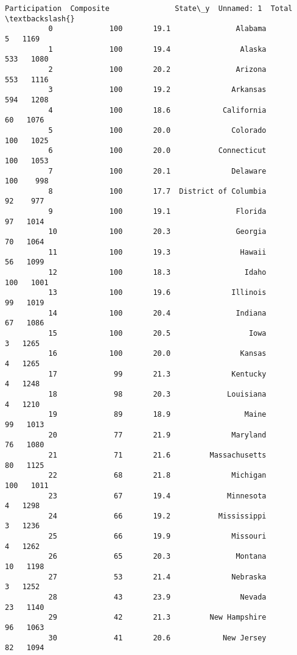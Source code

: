 \documentclass[11pt]{article}
\begin{document}
\begin{Verbatim}[commandchars=\\\{\}]
              Participation  Composite               State\_y  Unnamed: 1  Total  \textbackslash{}
          0             100       19.1               Alabama           5   1169   
          1             100       19.4                Alaska         533   1080   
          2             100       20.2               Arizona         553   1116   
          3             100       19.2              Arkansas         594   1208   
          4             100       18.6            California          60   1076   
          5             100       20.0              Colorado         100   1025   
          6             100       20.0           Connecticut         100   1053   
          7             100       20.1              Delaware         100    998   
          8             100       17.7  District of Columbia          92    977   
          9             100       19.1               Florida          97   1014   
          10            100       20.3               Georgia          70   1064   
          11            100       19.3                Hawaii          56   1099   
          12            100       18.3                 Idaho         100   1001   
          13            100       19.6              Illinois          99   1019   
          14            100       20.4               Indiana          67   1086   
          15            100       20.5                  Iowa           3   1265   
          16            100       20.0                Kansas           4   1265   
          17             99       21.3              Kentucky           4   1248   
          18             98       20.3             Louisiana           4   1210   
          19             89       18.9                 Maine          99   1013   
          20             77       21.9              Maryland          76   1080   
          21             71       21.6         Massachusetts          80   1125   
          22             68       21.8              Michigan         100   1011   
          23             67       19.4             Minnesota           4   1298   
          24             66       19.2           Mississippi           3   1236   
          25             66       19.9              Missouri           4   1262   
          26             65       20.3               Montana          10   1198   
          27             53       21.4              Nebraska           3   1252   
          28             43       23.9                Nevada          23   1140   
          29             42       21.3         New Hampshire          96   1063   
          30             41       20.6            New Jersey          82   1094   

\end{Verbatim}
\end{document}
